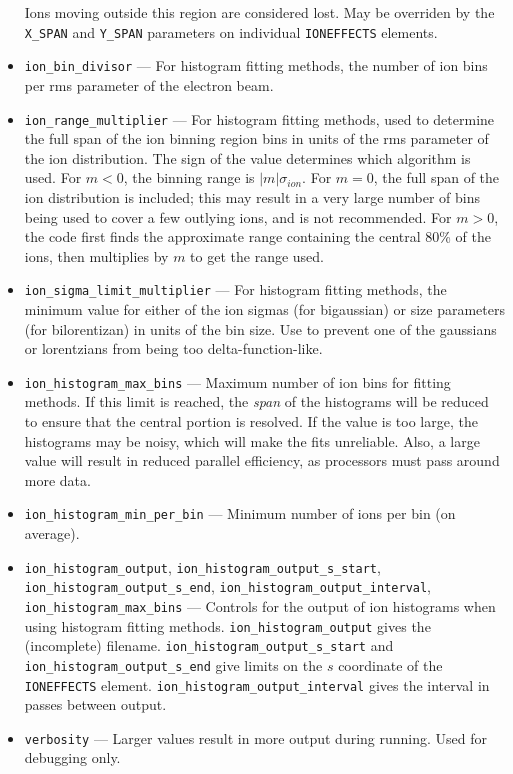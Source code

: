 \documentclass[11pt]{article}
\begin{document}
\begin{itemize}
  Ions moving outside this region are considered lost. May be overriden by the \verb|X_SPAN| and \verb|Y_SPAN| parameters
  on individual \verb|IONEFFECTS| elements.
\item \verb|ion_bin_divisor| --- For histogram fitting methods, the number of ion bins per rms parameter of the electron beam.
\item \verb|ion_range_multiplier| --- For  histogram fitting methods,
  used to determine the full span of the ion binning region bins in units of the rms parameter of the ion distribution.
  The sign of the value determines which algorithm is used.
  For $m<0$, the binning range is $\left|m\right|\sigma_{ion}$.
  For $m=0$, the full span of the ion distribution is included; this may result in a very large number of bins being
  used to cover a few outlying ions, and is not recommended.
  For $m>0$, the code first finds the approximate range containing the central 80\% of the ions, then multiplies by
  $m$ to get the range used.
\item \verb|ion_sigma_limit_multiplier| --- For  histogram fitting methods,
  the minimum value for either of the ion sigmas (for bigaussian) or size parameters (for bilorentizan)
  in units of the bin size. Use to prevent one of the gaussians or lorentzians from being too delta-function-like.
\item \verb|ion_histogram_max_bins| --- Maximum number of ion bins for fitting methods.
  If this limit is reached, the {\em span} of the histograms will  be reduced to ensure that the central portion is
  resolved.
  If the value is  too large, the histograms may
  be noisy, which will make the fits unreliable. Also, a large value will result in reduced parallel efficiency, as
  processors must pass around more data. 
\item \verb|ion_histogram_min_per_bin| --- Minimum number of ions per bin (on average).
\item \verb|ion_histogram_output|, \verb|ion_histogram_output_s_start|, \verb|ion_histogram_output_s_end|, 
      \verb|ion_histogram_output_interval|, \verb|ion_histogram_max_bins| --- Controls for the output of ion histograms when
      using histogram fitting methods.
      \verb|ion_histogram_output| gives the (incomplete) filename.
      \verb|ion_histogram_output_s_start| and \verb|ion_histogram_output_s_end| give limits on the $s$ coordinate of the
      \verb|IONEFFECTS| element. \verb|ion_histogram_output_interval| gives the interval in passes between output.
\item \verb|verbosity| --- Larger values result in more output during running. Used for debugging only.
\end{itemize}
\end{document}
